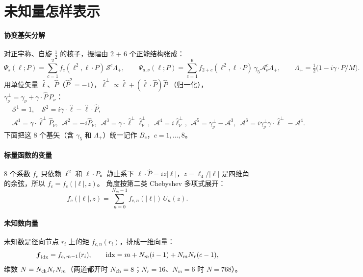 \documentclass[11pt,a4paper]{ctexart}
\begin{document}
\section{未知量怎样表示}

\paragraph{协变基矢分解} 对正宇称、自旋 $\tfrac12$ 的核子，振幅由 2 + 6 个正能结构张成：
\begin{equation}\label{eq:basis}
\Psi_s(\ell;P)=\sum_{c=1}^{2} f_{c}(\ell^2,\ell\!\cdot\!P)\,\mathcal S^{c}\Lambda_+,\qquad
\Psi_{a,\nu}(\ell;P)=\sum_{c=1}^{6} f_{2+c}(\ell^2,\ell\!\cdot\!P)\,\gamma_5\mathcal A^{c}_\nu\Lambda_+,
\qquad \Lambda_+=\tfrac12\big(1-i\gamma\!\cdot\!P/M\big).
\end{equation}
用单位矢量 $\hat\ell$、$\hat P$（$\hat P^2=-1$），$\hat\ell^\perp\propto\hat\ell+(\hat\ell\!\cdot\!\hat P)\hat P$
（归一化），$\gamma^\perp_\nu=\gamma_\nu+\gamma\!\cdot\!\hat P\,\hat P_\nu$：
\begin{align*}
&\mathcal S^1=1,\quad \mathcal S^2=i\gamma\!\cdot\!\hat\ell-\hat\ell\!\cdot\!\hat P,\\
&\mathcal A^1=\gamma\!\cdot\!\hat\ell^\perp\hat P_\nu,\ \ \mathcal A^2=-i\hat P_\nu,\ \
\mathcal A^3=\gamma\!\cdot\!\hat\ell^\perp\hat\ell^\perp_\nu,\ \ \mathcal A^4=i\hat\ell^\perp_\nu,\ \
\mathcal A^5=\gamma^\perp_\nu-\mathcal A^3,\ \ \mathcal A^6=i\gamma^\perp_\nu\gamma\!\cdot\!\hat\ell^\perp-\mathcal A^4.
\end{align*}
下面把这 8 个基矢（含 $\gamma_5$ 和 $\Lambda_+$）统一记作 $B_c$，$c=1,\dots,8$。

\paragraph{标量函数的变量} 8 个系数 $f_c$ 只依赖 $\ell^2$ 和 $\ell\!\cdot\!P$。静止系下
$\ell\!\cdot\!\hat P=iz|\ell|$，$z=\ell_4/|\ell|$ 是四维角的余弦，所以 $f_c=f_c(|\ell|,z)$。
角度按第二类 Chebyshev 多项式展开：
\begin{equation}\label{eq:cheb}
f_c(|\ell|,z)=\sum_{n=0}^{N_m-1} f_{c,n}(|\ell|)\,U_n(z).
\end{equation}

\paragraph{未知数向量} 未知数是径向节点 $r_i$ 上的矩 $f_{c,n}(r_i)$，排成一维向量：
\[
\boldsymbol f_{\rm idx}=f_{c,\,m-1}(r_i),\qquad {\rm idx}=m+N_m(i-1)+N_mN_r(c-1),
\]
维数 $N=N_{\rm ch}N_rN_m$（两道都开时 $N_{\rm ch}=8$；$N_r=16$、$N_m=6$ 时 $N=768$）。
\end{document}
